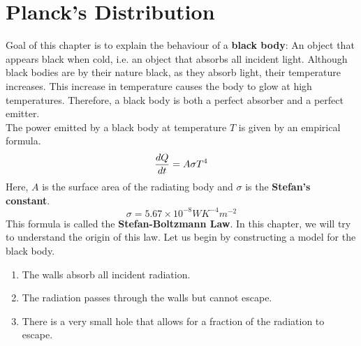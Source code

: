 \chapter{Planck's Distribution}

Goal of this chapter is to explain the behaviour of a \textbf{black body}: An object that appears black when cold, i.e. an object that absorbs all incident light. Although black bodies are by their nature black, as they absorb light, their temperature increases. This increase in temperature causes the body to glow at high temperatures. Therefore, a black body is both a perfect absorber and a perfect emitter. \\
The power emitted by a black body at temperature $T$ is given by an empirical formula. 
\begin{equation}
    \frac{d Q}{d t} = A\sigma T^4
\end{equation}
Here, $A$ is the surface area of the radiating body and $\sigma$ is the \textbf{Stefan's constant}. 
\begin{equation}
    \sigma = 5.67\times 10^{-8} \si{WK^{-4}m^{-2}}
\end{equation}
This formula is called the \textbf{Stefan-Boltzmann Law}. In this chapter, we will try to understand the origin of this law. Let us begin by constructing a model for the black body.\\
\begin{enumerate}
    \item The walls absorb all incident radiation.
    \item The radiation passes through the walls but cannot escape.
    \item There is a very small hole that allows for a fraction of the radiation to escape. 
\end{enumerate}

